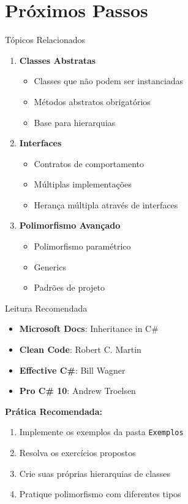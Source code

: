 \documentclass[aspectratio=169]{beamer}
\begin{document}
\section{Próximos Passos}

\begin{frame}{Tópicos Relacionados}
\begin{enumerate}
\item \textbf{Classes Abstratas}
\begin{itemize}
\item Classes que não podem ser instanciadas
\item Métodos abstratos obrigatórios
\item Base para hierarquias
\end{itemize}

\item \textbf{Interfaces}
\begin{itemize}
\item Contratos de comportamento
\item Múltiplas implementações
\item Herança múltipla através de interfaces
\end{itemize}

\item \textbf{Polimorfismo Avançado}
\begin{itemize}
\item Polimorfismo paramétrico
\item Generics
\item Padrões de projeto
\end{itemize}
\end{enumerate}
\end{frame}

\begin{frame}{Leitura Recomendada}
\begin{itemize}
\item \textbf{Microsoft Docs}: Inheritance in C\#
\item \textbf{Clean Code}: Robert C. Martin
\item \textbf{Effective C\#}: Bill Wagner
\item \textbf{Pro C\# 10}: Andrew Troelsen
\end{itemize}

\vspace{0.5cm}
\textbf{Prática Recomendada:}
\begin{enumerate}
\item Implemente os exemplos da pasta \texttt{Exemplos}
\item Resolva os exercícios propostos
\item Crie suas próprias hierarquias de classes
\item Pratique polimorfismo com diferentes tipos
\end{enumerate}
\end{frame}
\end{document}
